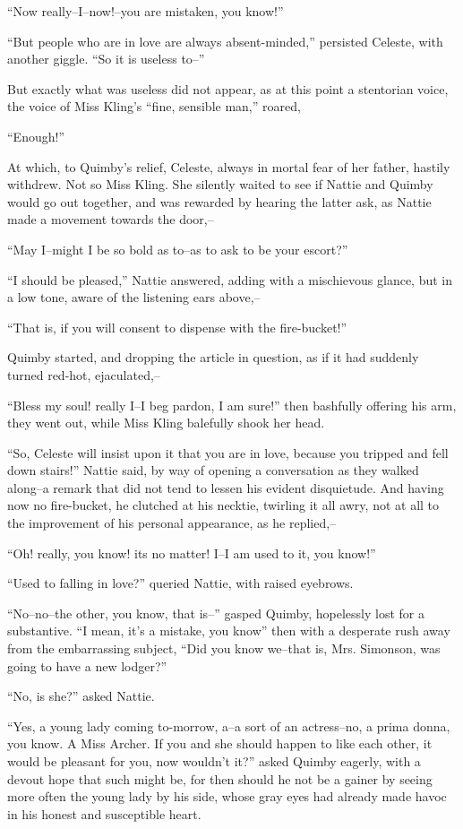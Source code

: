 ``Now really--I--now!--you are mistaken, you know!''

``But people who are in love are always absent-minded,'' persisted
Celeste, with another giggle. ``So it is useless to--''

But exactly what was useless did not appear, as at this point a
stentorian voice, the voice of Miss Kling's ``fine, sensible man,''
roared,

``Enough!''

At which, to Quimby's relief, Celeste, always in mortal fear of her
father, hastily withdrew. Not so Miss Kling. She silently waited to see
if Nattie and Quimby would go out together, and was rewarded by hearing
the latter ask, as Nattie made a movement towards the door,--

``May I--might I be so bold as to--as to ask to be your escort?''

``I should be pleased,'' Nattie answered, adding with a mischievous
glance, but in a low tone, aware of the listening ears above,--

``That is, if you will consent to dispense with the fire-bucket!''

Quimby started, and dropping the article in question, as if it had
suddenly turned red-hot, ejaculated,--

``Bless my soul! really I--I beg pardon, I am sure!'' then bashfully
offering his arm, they went out, while Miss Kling balefully shook her
head.

``So, Celeste will insist upon it that you are in love, because you
tripped and fell down stairs!'' Nattie said, by way of opening a
conversation as they walked along--a remark that did not tend to lessen
his evident disquietude. And having now no fire-bucket, he clutched at
his necktie, twirling it all awry, not at all to the improvement of his
personal appearance, as he replied,--

``Oh! really, you know! its no matter! I--I am used to it, you know!''

``Used to falling in love?'' queried Nattie, with raised eyebrows.

``No--no--the other, you know, that is--'' gasped Quimby, hopelessly lost
for a substantive. ``I mean, it's a mistake, you know'' then with a
desperate rush away from the embarrassing subject, ``Did you know
we--that is, Mrs. Simonson, was going to have a new lodger?''

``No, is she?'' asked Nattie.

``Yes, a young lady coming to-morrow, a--a sort of an actress--no, a
prima donna, you know. A Miss Archer. If you and she should happen to
like each other, it would be pleasant for you, now wouldn't it?'' asked
Quimby eagerly, with a devout hope that such might be, for then should
he not be a gainer by seeing more often the young lady by his side,
whose gray eyes had already made havoc in his honest and susceptible
heart.

